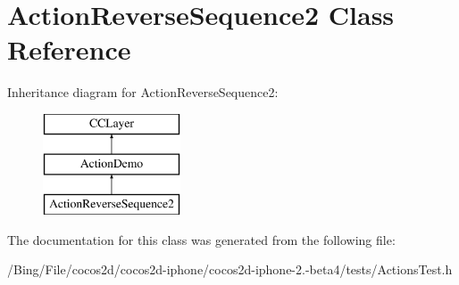 \hypertarget{interface_action_reverse_sequence2}{\section{Action\-Reverse\-Sequence2 Class Reference}
\label{interface_action_reverse_sequence2}
}
Inheritance diagram for Action\-Reverse\-Sequence2\-:\begin{figure}[H]
\begin{center}
\leavevmode
\includegraphics[height=3.000000cm]{interface_action_reverse_sequence2}
\end{center}
\end{figure}


The documentation for this class was generated from the following file\-:\begin{DoxyCompactItemize}
\item 
/\-Bing/\-File/cocos2d/cocos2d-\/iphone/cocos2d-\/iphone-\/2.-\/beta4/tests/Actions\-Test.\-h\end{DoxyCompactItemize}
